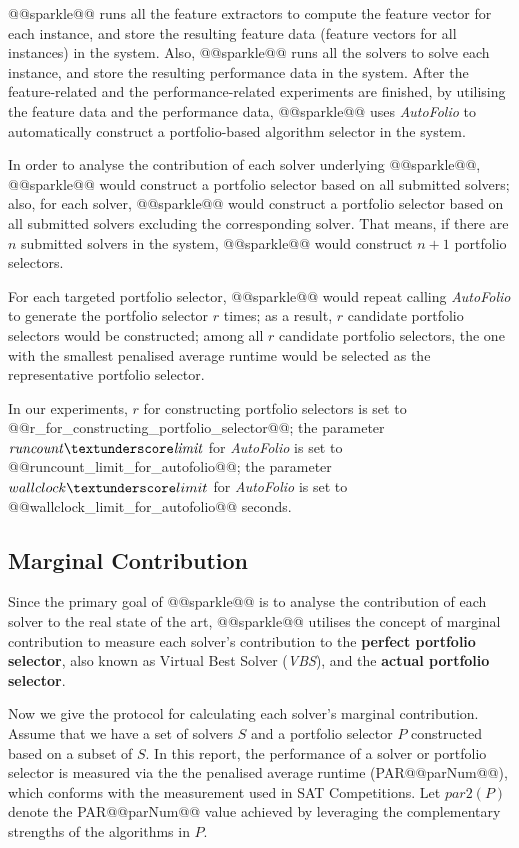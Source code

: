 \documentclass[british]{article}
\begin{document}
@@sparkle@@ runs all the feature extractors to compute the feature vector for each instance, and store the resulting feature data (feature vectors for all instances) in the system. Also, @@sparkle@@ runs all the solvers to solve each instance, and store the resulting performance data in the system. After the feature-related and the performance-related experiments are finished, by utilising the feature data and the performance data, @@sparkle@@ uses \emph{AutoFolio} \cite{LinEtAl15} to automatically construct a portfolio-based algorithm selector in the system.

In order to analyse the contribution of each solver underlying @@sparkle@@, @@sparkle@@ would construct a portfolio selector based on all submitted solvers; also, for each solver, @@sparkle@@ would construct a portfolio selector based on all submitted solvers excluding the corresponding solver. That means, if there are $n$ submitted solvers in the system, @@sparkle@@ would construct $n+1$ portfolio selectors.

For each targeted portfolio selector, @@sparkle@@ would repeat calling \emph{AutoFolio} to generate the portfolio selector $r$ times; as a result, $r$ candidate portfolio selectors would be constructed; among all $r$ candidate portfolio selectors, the one with the smallest penalised average runtime would be selected as the representative portfolio selector.

In our experiments, $r$ for constructing portfolio selectors is set to @@r_for_constructing_portfolio_selector@@; the parameter $\mathit{runcount\textunderscore limit}$ for \emph{AutoFolio} is set to @@runcount_limit_for_autofolio@@; the parameter $wallclock\textunderscore limit$ for \emph{AutoFolio} is set to @@wallclock_limit_for_autofolio@@ seconds.

\subsection{Marginal Contribution}
\label{sec:Marginal_Contribution}

Since the primary goal of @@sparkle@@ is to analyse the contribution of each solver to the real state of the art, @@sparkle@@ utilises the concept of marginal contribution \cite{XuEtAl12} to measure each solver's contribution to the \textbf{perfect portfolio selector}, also known as Virtual Best Solver (\emph{VBS}), and the \textbf{actual portfolio selector}.

Now we give the protocol for calculating each solver's marginal contribution. Assume that we have a set of solvers $S$ and a portfolio selector $P$ constructed based on a subset of $S$. In this report, the performance of a solver or portfolio selector is measured via the the penalised average runtime (PAR@@parNum@@), which conforms with the measurement used in SAT Competitions. Let $\mathit{par2(P)}$ denote the PAR@@parNum@@ value achieved by leveraging the complementary strengths of the algorithms in $P$.
\end{document}

